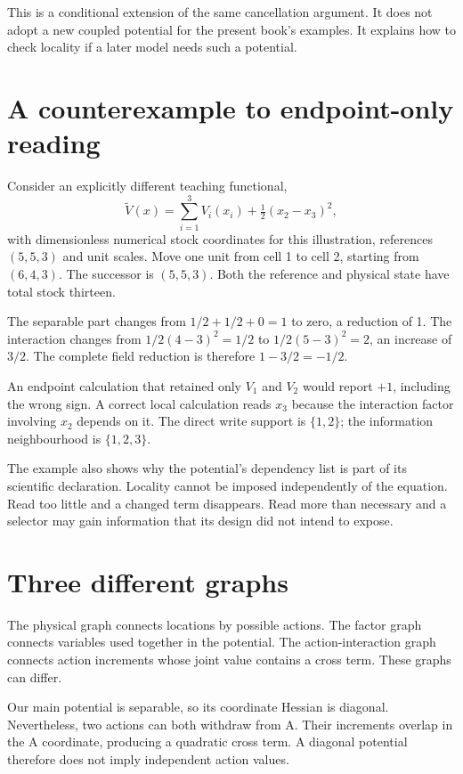 This is a conditional extension of the same cancellation argument. It does not adopt a new coupled potential for the present book's examples. It explains how to check locality if a later model needs such a potential.

\section{A counterexample to endpoint-only reading}
Consider an explicitly different teaching functional,
\[
 \widetilde V(x)=\sum_{i=1}^{3}V_i(x_i)+\tfrac12(x_2-x_3)^2,
\]
with dimensionless numerical stock coordinates for this illustration, references $(5,5,3)$ and unit scales. Move one unit from cell 1 to cell 2, starting from $(6,4,3)$. The successor is $(5,5,3)$. Both the reference and physical state have total stock thirteen.

The separable part changes from $1/2+1/2+0=1$ to zero, a reduction of 1. The interaction changes from $1/2(4-3)^2=1/2$ to $1/2(5-3)^2=2$, an increase of $3/2$. The complete field reduction is therefore $1-3/2=-1/2$.

An endpoint calculation that retained only $V_1$ and $V_2$ would report $+1$, including the wrong sign. A correct local calculation reads $x_3$ because the interaction factor involving $x_2$ depends on it. The direct write support is $\{1,2\}$; the information neighbourhood is $\{1,2,3\}$.

The example also shows why the potential's dependency list is part of its scientific declaration. Locality cannot be imposed independently of the equation. Read too little and a changed term disappears. Read more than necessary and a selector may gain information that its design did not intend to expose.

\section{Three different graphs}
The physical graph connects locations by possible actions. The factor graph connects variables used together in the potential. The action-interaction graph connects action increments whose joint value contains a cross term. These graphs can differ.

Our main potential is separable, so its coordinate Hessian is diagonal. Nevertheless, two actions can both withdraw from A. Their increments overlap in the A coordinate, producing a quadratic cross term. A diagonal potential therefore does not imply independent action values.

